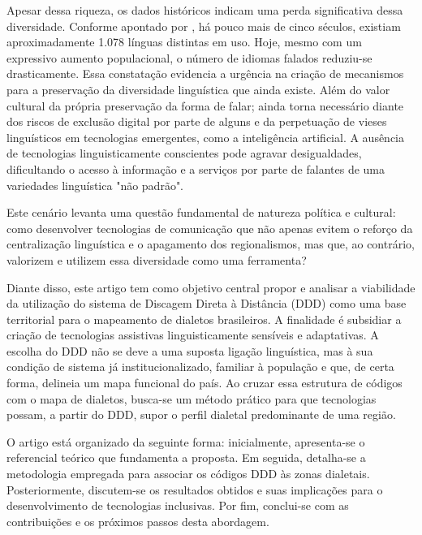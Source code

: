 \begin{flushleft}
Apesar dessa riqueza, os dados históricos indicam uma perda significativa dessa diversidade. Conforme apontado por \cite{rodrigues_linguas_nodate}, há pouco mais de cinco séculos, existiam aproximadamente 1.078 línguas distintas em uso. Hoje, mesmo com um expressivo aumento populacional, o número de idiomas falados reduziu-se drasticamente. Essa constatação evidencia a urgência na criação de mecanismos para a preservação da diversidade linguística que ainda existe. Além do valor cultural da própria preservação da forma de falar; ainda torna necessário diante dos riscos de exclusão digital por parte de alguns e da perpetuação de vieses linguísticos em tecnologias emergentes, como a inteligência artificial. A ausência de tecnologias linguisticamente conscientes pode agravar desigualdades, dificultando o acesso à informação e a serviços por parte de falantes de uma variedades linguística "não padrão".

Este cenário levanta uma questão fundamental de natureza política e cultural: como desenvolver tecnologias de comunicação que não apenas evitem o reforço da centralização linguística e o apagamento dos regionalismos, mas que, ao contrário, valorizem e utilizem essa diversidade como uma ferramenta?

Diante disso, este artigo tem como objetivo central propor e analisar a viabilidade da utilização do sistema de Discagem Direta à Distância (DDD) como uma base territorial para o mapeamento de dialetos brasileiros. A finalidade é subsidiar a criação de tecnologias assistivas linguisticamente sensíveis e adaptativas. A escolha do DDD não se deve a uma suposta ligação linguística, mas à sua condição de sistema já institucionalizado, familiar à população e que, de certa forma, delineia um mapa funcional do país. Ao cruzar essa estrutura de códigos com o mapa de dialetos, busca-se um método prático para que tecnologias possam, a partir do DDD, supor o perfil dialetal predominante de uma região.

O artigo está organizado da seguinte forma: inicialmente, apresenta-se o referencial teórico que fundamenta a proposta. Em seguida, detalha-se a metodologia empregada para associar os códigos DDD às zonas dialetais. Posteriormente, discutem-se os resultados obtidos e suas implicações para o desenvolvimento de tecnologias inclusivas. Por fim, conclui-se com as contribuições e os próximos passos desta abordagem.



\end{flushleft}


